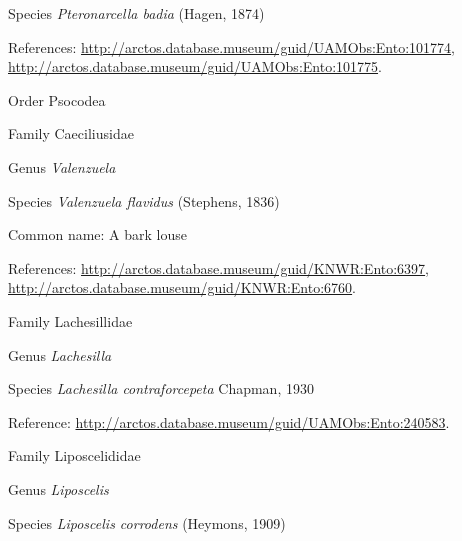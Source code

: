 \documentclass[9pt, article]{memoir}
\begin{document}
\begin{multicols}{2}
\vspace{6pt}\noindent\hspace{36pt}Species \textit{Pteronarcella badia} (Hagen, 1874)


References: 
\url{http://arctos.database.museum/guid/UAMObs:Ento:101774}, 
\url{http://arctos.database.museum/guid/UAMObs:Ento:101775}.

\vspace{6pt}\noindent\hspace{18pt}Order Psocodea


\vspace{6pt}\noindent\hspace{24pt}Family Caeciliusidae


\vspace{6pt}\noindent\hspace{30pt}Genus \textit{Valenzuela}


\vspace{6pt}\noindent\hspace{36pt}Species \textit{Valenzuela flavidus} (Stephens, 1836)


Common name: A bark louse

References: 
\url{http://arctos.database.museum/guid/KNWR:Ento:6397}, 
\url{http://arctos.database.museum/guid/KNWR:Ento:6760}.

\vspace{6pt}\noindent\hspace{24pt}Family Lachesillidae


\vspace{6pt}\noindent\hspace{30pt}Genus \textit{Lachesilla}


\vspace{6pt}\noindent\hspace{36pt}Species \textit{Lachesilla contraforcepeta} Chapman, 1930


Reference: 
\url{http://arctos.database.museum/guid/UAMObs:Ento:240583}.

\vspace{6pt}\noindent\hspace{24pt}Family Liposcelididae


\vspace{6pt}\noindent\hspace{30pt}Genus \textit{Liposcelis}


\vspace{6pt}\noindent\hspace{36pt}Species \textit{Liposcelis corrodens} (Heymons, 1909)



\end{multicols}
\end{document}
